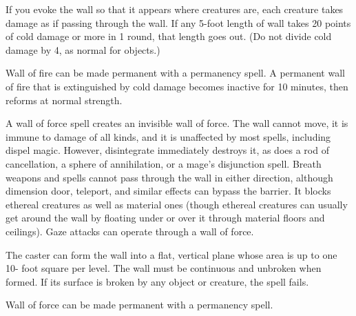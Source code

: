 \begin{multicols}{2}
\begin{small}
\smallskip\noindent If you evoke the wall so that it appears where creatures are, each creature takes damage as if passing through the wall. If any 5-foot length of wall takes 20 points of cold damage or more in 1 round, that length goes out. (Do not divide cold damage by 4, as normal for objects.)

\smallskip\noindent Wall of fire can be made permanent with a permanency spell. A permanent wall of fire that is extinguished by cold damage becomes inactive for 10 minutes, then reforms at normal strength.


\noindent A wall of force spell creates an invisible wall of force. The wall cannot move, it is immune to damage of all kinds, and it is unaffected by most spells, including dispel magic. However, disintegrate immediately destroys it, as does a rod of cancellation, a sphere of annihilation, or a mage's disjunction spell. Breath weapons and spells cannot pass through the wall in either direction, although dimension door, teleport, and similar effects can bypass the barrier. It blocks ethereal creatures as well as material ones (though ethereal creatures can usually get around the wall by floating under or over it through material floors and ceilings). Gaze attacks can operate through a wall of force.

\smallskip\noindent The caster can form the wall into a flat, vertical plane whose area is up to one 10- foot square per level. The wall must be continuous and unbroken when formed. If its surface is broken by any object or creature, the spell fails.

\smallskip\noindent Wall of force can be made permanent with a permanency spell.



\end{small}
\end{multicols}
